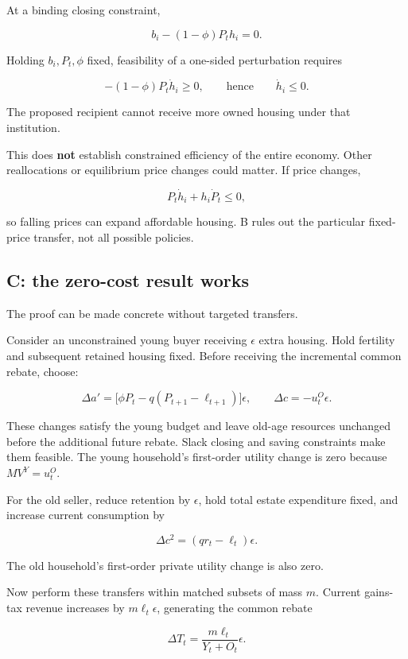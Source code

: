 \documentclass[11pt,letterpaper]{article}
\begin{document}
At a binding closing constraint,

\[
b_i-(1-\phi)P_th_i=0.
\]

Holding \(b_i,P_t,\phi\) fixed, feasibility of a one-sided perturbation requires

\[
-(1-\phi)P_t\dot h_i\geq0,
\qquad\text{hence}\qquad \dot h_i\leq0.
\]

The proposed recipient cannot receive more owned housing under that institution.

This does \textbf{not} establish constrained efficiency of the entire economy. Other
reallocations or equilibrium price changes could matter. If price changes,

\[
P_t\dot h_i+h_i\dot P_t\leq0,
\]

so falling prices can expand affordable housing. B rules out the particular fixed-price
transfer, not all possible policies.

\subsection{C: the zero-cost result works}\label{c-the-zero-cost-result-works}

The proof can be made concrete without targeted transfers.

Consider an unconstrained young buyer receiving \(\epsilon\) extra housing. Hold fertility
and subsequent retained housing fixed. Before receiving the incremental common rebate,
choose:

\[
\Delta a'
=\bigl[\phi P_t-q(P_{t+1}-\ell_{t+1})\bigr]\epsilon,
\qquad
\Delta c=-u_t^O\epsilon.
\]

These changes satisfy the young budget and leave old-age resources unchanged before the
additional future rebate. Slack closing and saving constraints make them feasible. The
young household's first-order utility change is zero because \(MV^Y=u_t^O\).

For the old seller, reduce retention by \(\epsilon\), hold total estate expenditure fixed,
and increase current consumption by

\[
\Delta c^2=(qr_t-\ell_t)\epsilon.
\]

The old household's first-order private utility change is also zero.

Now perform these transfers within matched subsets of mass \(m\). Current gains-tax
revenue increases by \(m\ell_t\epsilon\), generating the common rebate

\[
\Delta T_t=\frac{m\ell_t}{Y_t+O_t}\epsilon.
\]
\end{document}
